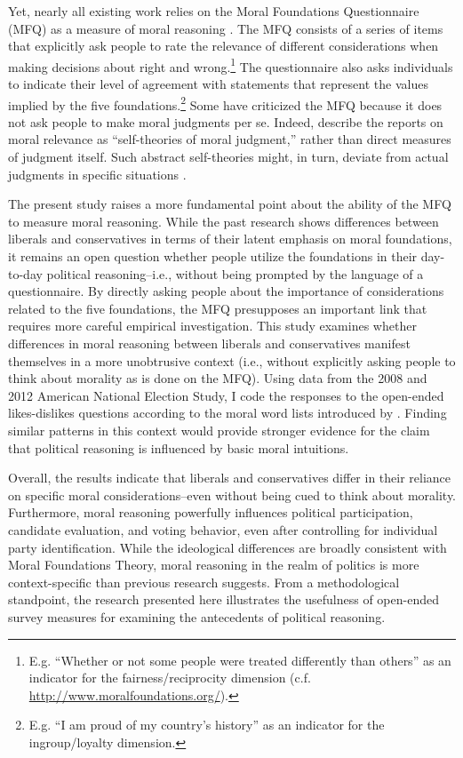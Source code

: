 \documentclass[12pt]{article}
\begin{document}
Yet, nearly all existing work relies on the Moral Foundations Questionnaire (MFQ) as a measure of moral reasoning \citep[but see][]{clifford2014linking}. The MFQ consists of a series of items that explicitly ask people to rate the relevance of different considerations when making decisions about right and wrong.\footnote{E.g. ``Whether or not some people were treated differently than others'' as an indicator for the fairness/reciprocity dimension (c.f. \url{http://www.moralfoundations.org/}).} The questionnaire also asks individuals to indicate their level of agreement with statements that represent the values implied by the five foundations.\footnote{E.g. ``I am proud of my country’s history'' as an indicator for the ingroup/loyalty dimension.} Some have criticized the MFQ because it does not ask people to make moral judgments per se. Indeed, \citet[1031]{graham2009liberals} describe the reports on moral relevance as ``self-theories of moral judgment,'' rather than direct measures of judgment itself. Such abstract self-theories might, in turn, deviate from actual judgments in specific situations \citep[see][for an alternative way to measure moral judgment]{clifford2015moral}.

The present study raises a more fundamental point about the ability of the MFQ to measure moral reasoning. While the past research shows differences between liberals and conservatives in terms of their latent emphasis on moral foundations, it remains an open question whether people utilize the foundations in their day-to-day political reasoning--i.e., without being prompted by the language of a questionnaire. By directly asking people about the importance of considerations related to the five foundations, the MFQ presupposes an important link that requires more careful empirical investigation. This study examines whether differences in moral reasoning between liberals and conservatives manifest themselves in a more unobtrusive context (i.e., without explicitly asking people to think about morality as is done on the MFQ). Using data from the 2008 and 2012 American National Election Study, I code the responses to the open-ended likes-dislikes questions according to the moral word lists introduced by \citet{graham2009liberals}. Finding similar patterns in this context would provide stronger evidence for the claim that political reasoning is influenced by basic moral intuitions. 

Overall, the results indicate that liberals and conservatives differ in their reliance on specific moral considerations--even without being cued to think about morality. Furthermore, moral reasoning powerfully influences political participation, candidate evaluation, and voting behavior, even after controlling for individual party identification. While the ideological differences are broadly consistent with Moral Foundations Theory, moral reasoning in the realm of politics is more context-specific than previous research suggests. From a methodological standpoint, the research presented here illustrates the usefulness of open-ended survey measures for examining the antecedents of political reasoning.
\end{document}
